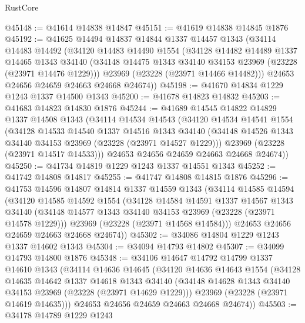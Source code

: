 \begin{lexlean}{RustCore}
\begin{coremodule}
@45148 := @41614 @14838 @14847
@45151 := @41619 @14838 @14845 @1876
@45192 := @41625
    @14494
    @14837
    @14844
    @1337
    @14457
    @1343
    (@34114
      @14483
      @14492
      (@34120
        @14483
        @14490
        @1554
        (@34128
          @14482
          @14489
          @1337
          @14465
          @1343
          @34140
          (@34148 @14475 @1343 @34140 @34153 @23969 (@23228 (@23971 @14476 @1229)))
          @23969
          (@23228 (@23971 @14466 @14482)))
        @24653
        @24656
        @24659
        @24663
        @24668
        @24674))
@45198 := @41670 @14834 @1229 @1243 @1337 @14500 @1343
@45200 := @41678 @14823 @14832
@45203 := @41683 @14823 @14830 @1876
@45244 := @41689
    @14545
    @14822
    @14829
    @1337
    @14508
    @1343
    (@34114
      @14534
      @14543
      (@34120
        @14534
        @14541
        @1554
        (@34128
          @14533
          @14540
          @1337
          @14516
          @1343
          @34140
          (@34148 @14526 @1343 @34140 @34153 @23969 (@23228 (@23971 @14527 @1229)))
          @23969
          (@23228 (@23971 @14517 @14533)))
        @24653
        @24656
        @24659
        @24663
        @24668
        @24674))
@45250 := @41734 @14819 @1229 @1243 @1337 @14551 @1343
@45252 := @41742 @14808 @14817
@45255 := @41747 @14808 @14815 @1876
@45296 := @41753
    @14596
    @14807
    @14814
    @1337
    @14559
    @1343
    (@34114
      @14585
      @14594
      (@34120
        @14585
        @14592
        @1554
        (@34128
          @14584
          @14591
          @1337
          @14567
          @1343
          @34140
          (@34148 @14577 @1343 @34140 @34153 @23969 (@23228 (@23971 @14578 @1229)))
          @23969
          (@23228 (@23971 @14568 @14584)))
        @24653
        @24656
        @24659
        @24663
        @24668
        @24674))
@45302 := @34086 @14804 @1229 @1243 @1337 @14602 @1343
@45304 := @34094 @14793 @14802
@45307 := @34099 @14793 @14800 @1876
@45348 := @34106
    @14647
    @14792
    @14799
    @1337
    @14610
    @1343
    (@34114
      @14636
      @14645
      (@34120
        @14636
        @14643
        @1554
        (@34128
          @14635
          @14642
          @1337
          @14618
          @1343
          @34140
          (@34148 @14628 @1343 @34140 @34153 @23969 (@23228 (@23971 @14629 @1229)))
          @23969
          (@23228 (@23971 @14619 @14635)))
        @24653
        @24656
        @24659
        @24663
        @24668
        @24674))
@45503 := @34178
    @14789
    @1229
    @1243

\end{coremodule}
\end{lexlean}
